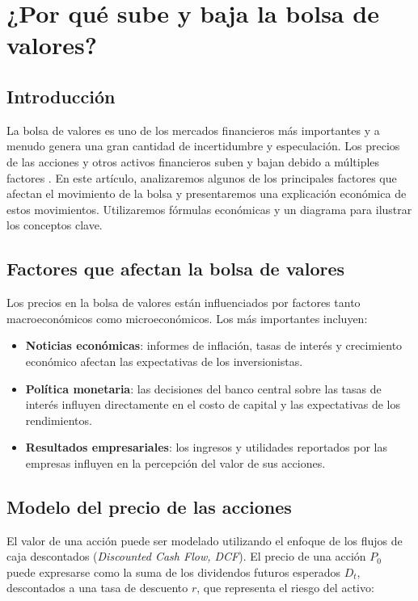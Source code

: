 \chapter{¿Por qué sube y baja la bolsa de valores?}

\section{Introducción}

La bolsa de valores es uno de los mercados financieros más importantes y a menudo genera una gran cantidad de incertidumbre y especulación. Los precios de las acciones y otros activos financieros suben y bajan debido a múltiples factores \parencite{@5286-ZVI2013,@5287-FREDERIC2018}. En este artículo, analizaremos algunos de los principales factores que afectan el movimiento de la bolsa y presentaremos una explicación económica de estos movimientos. Utilizaremos fórmulas económicas y un diagrama para ilustrar los conceptos clave.

\section{Factores que afectan la bolsa de valores}

Los precios en la bolsa de valores están influenciados por factores tanto macroeconómicos como microeconómicos. Los más importantes incluyen:

\begin{itemize}
\item \textbf{Noticias económicas}: informes de inflación, tasas de interés y crecimiento económico afectan las expectativas de los inversionistas.
\item \textbf{Política monetaria}: las decisiones del banco central sobre las tasas de interés influyen directamente en el costo de capital y las expectativas de los rendimientos.
\item \textbf{Resultados empresariales}: los ingresos y utilidades reportados por las empresas influyen en la percepción del valor de sus acciones.
\end{itemize}

\section{Modelo del precio de las acciones}

El valor de una acción puede ser modelado utilizando el enfoque de los flujos de caja descontados (\textit{Discounted Cash Flow, DCF}). El precio de una acción $P_0$ puede expresarse como la suma de los dividendos futuros esperados $D_t$, descontados a una tasa de descuento $r$, que representa el riesgo del activo:

